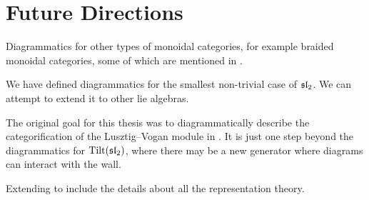 \chapter{Future Directions}
\label{chapter:future-directions}


Diagrammatics for other types of monoidal categories, for example braided monoidal categories, some of which are mentioned in \cite{selinger-survey-of-graphical-monoidal-categories}.

We have defined diagrammatics for the smallest non-trivial case of $\operatorname{\mathfrak{sl}}_2$. We can attempt to extend it to other lie algebras.

The original goal for this thesis was to diagrammatically describe the categorification of the Lusztig--Vogan module in \cite{categorification-lusztig-vogan-module}. It is just one step beyond the diagrammatics for $\operatorname{Tilt}(\operatorname{\mathfrak{sl}}_2)$, where there may be a new generator where diagrams can interact with the wall.

Extending to include the details about all the representation theory.

